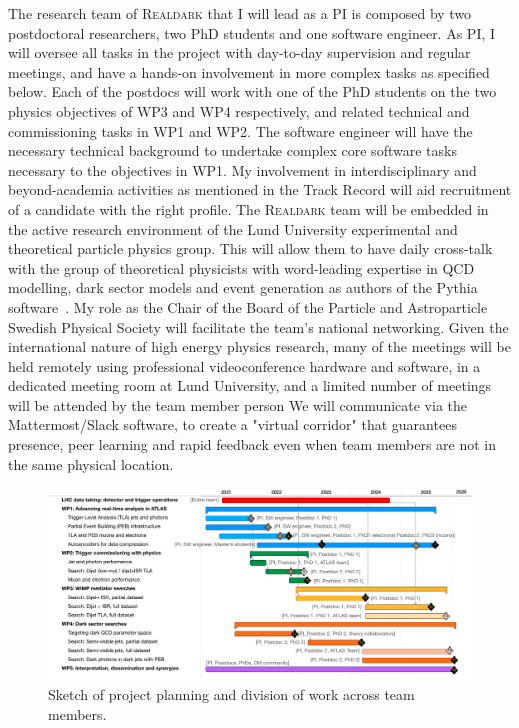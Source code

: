 The research team of \textsc{Realdark} that I will lead as a PI is composed by two postdoctoral researchers, two PhD students and one software engineer.
As PI, I will oversee all tasks in the project with day-to-day supervision and regular meetings, and have a hands-on involvement in more complex tasks as specified below. 
Each of the postdocs will work with one of the PhD students on the two physics objectives of WP3 and WP4 respectively, and related technical and commissioning tasks in WP1 and WP2. 
The software engineer will have the necessary technical background to undertake complex core software tasks necessary to the objectives in WP1. 
My involvement in interdisciplinary and beyond-academia activities as mentioned in the Track Record will aid recruitment of a candidate with the right profile. 
The \textsc{Realdark} team will be embedded in the active research environment of the Lund University experimental and theoretical particle physics group. 
This will allow them to have daily cross-talk with the group of theoretical physicists with word-leading expertise in QCD modelling, dark sector models and event generation as authors of the Pythia software~\cite{Sjostrand:2014zea}.  
My role as the Chair of the Board of the Particle and Astroparticle Swedish Physical Society will facilitate the team's national networking.   
Given the international nature of high energy physics research, many of the meetings will be held remotely using professional videoconference hardware and software, in a dedicated meeting room at Lund University, and a limited number of meetings will be attended by the team member person  
We will communicate via the Mattermost/Slack software, to create a "virtual corridor" that guarantees presence, peer learning and rapid feedback even when team members are not in the same physical location.  

\vskip5pt
\begin{figure}[!htpb] 
\begin{center}
\includegraphics[width=\textwidth]{figs_B2/gantt}
\caption{\color{black}\label{fig:gantt} \small Sketch of project planning and division of work across team members.} 
\vskip2pt
\end{center}
\end{figure}

